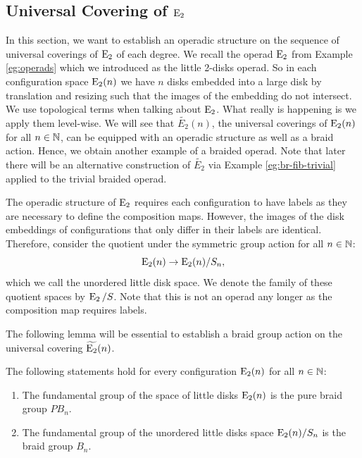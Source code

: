 \subsection{Universal Covering of $\operatorname{E}_2$}

In this section, we want to establish an operadic structure on the sequence of
universal coverings of $\operatorname{E}_2$ of each degree. We recall the operad $\operatorname{E}_2$ from
Example \ref{eg:operads} which we introduced as the little 2-disks operad. So in
each configuration space $\operatorname{E}_2(n)$ we have $n$ disks embedded into a large disk
by translation and resizing such that the images of the embedding do not intersect. We use topological
terms when talking about $\operatorname{E}_2$. What really is happening is we apply them
level-wise. We will see that $\widetilde{E_2}(n)$, the universal coverings of $\operatorname{E}_2(n)$ for all $n \in \mathbb{N}$,
can be equipped with an operadic structure as well as a braid action. Hence, we
obtain another example of a braided operad.
Note that later there will be an alternative construction of $\widetilde{E_2}$ via Example \ref{eg:br-fib-trivial}
applied to the trivial braided operad.


The operadic structure of $\operatorname{E}_2$ requires each configuration to have labels as they are necessary to define the
composition maps. However, the images of the disk embeddings of configurations that only
differ in their labels are identical. 
Therefore, consider the quotient
under the symmetric group action for all $n \in \mathbb{N}$:
\[
    \operatorname{E}_2(n) \to \operatorname{E}_2(n) \slash S_n,
\]
which we call the unordered little disk space.
We denote the family of these quotient spaces by $\operatorname{E}_2 \slash S$. Note that this is not
an operad any longer as the composition map requires labels. 


The following lemma will be essential to establish a braid group action on 
the universal covering $\widetilde{\operatorname{E}_2}(n)$.

\begin{lem}\label{lem:fundamentalgroup} The following statements hold for every
    configuration $\operatorname{E}_2(n)$ for all $n \in \mathbb{N}$:
    \begin{enumerate}
        \item The fundamental group of the space of little disks $\operatorname{E}_2(n)$ is the pure braid group $PB_n$.
        \item The fundamental group of the unordered little disks space $\operatorname{E}_2(n) \slash S_n$ is the braid
        group $B_n$.
    \end{enumerate}
\end{lem}

